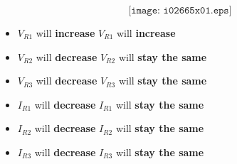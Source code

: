 
$$\texttt{[image: i02665x01.eps]}$$

\begin{itemize}
\item{} $V_{R1}$ will {\bf increase} \hskip 202pt $V_{R1}$ will {\bf increase}
\item{} $V_{R2}$ will {\bf decrease} \hskip 200pt $V_{R2}$ will {\bf stay the same}
\item{} $V_{R3}$ will {\bf decrease} \hskip 200pt $V_{R3}$ will {\bf stay the same}
\end{itemize}

\begin{itemize}
\item{} $I_{R1}$ will {\bf decrease} \hskip 200pt $I_{R1}$ will {\bf stay the same}
\item{} $I_{R2}$ will {\bf decrease} \hskip 200pt $I_{R2}$ will {\bf stay the same}
\item{} $I_{R3}$ will {\bf decrease} \hskip 200pt $I_{R3}$ will {\bf stay the same}
\end{itemize}




